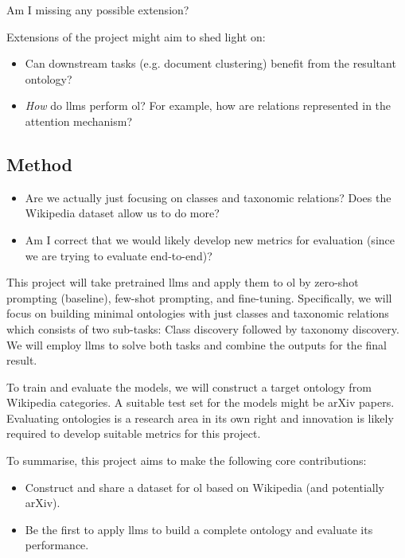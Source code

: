 \begin{note}
    Am I missing any possible extension?
\end{note}

Extensions of the project might aim to shed light on:
\begin{itemize}
    \item Can downstream tasks (e.g. document clustering) benefit from the resultant ontology?
    \item \emph{How} do \gls{llm}s perform \gls{ol}? For example, how are relations represented in the attention mechanism?
\end{itemize}

\subsection*{Method}

\begin{note}
    \begin{itemize}
        \item Are we actually just focusing on classes and taxonomic relations? Does the Wikipedia dataset allow us to do more?
        \item Am I correct that we would likely develop new metrics for evaluation (since we are trying to evaluate end-to-end)?
    \end{itemize}
\end{note}

This project will take pretrained \gls{llm}s and apply them to \gls{ol} by zero-shot prompting (baseline), few-shot prompting, and fine-tuning. Specifically, we will focus on building minimal ontologies with just classes and taxonomic relations which consists of two sub-tasks: Class discovery followed by taxonomy discovery. We will employ \gls{llm}s to solve both tasks and combine the outputs for the final result.

To train and evaluate the models, we will construct a target ontology from Wikipedia categories. A suitable test set for the models might be arXiv papers. Evaluating ontologies is a research area in its own right \citep{khadir2021ontology,ontology-eval} and innovation is likely required to develop suitable metrics for this project.

To summarise, this project aims to make the following core contributions:
\begin{itemize}
    \item Construct and share a dataset for \gls{ol} based on Wikipedia (and potentially arXiv).
    \item Be the first to apply \gls{llm}s to build a complete ontology and evaluate its performance.
\end{itemize}

